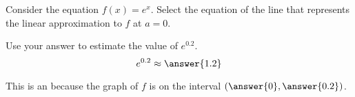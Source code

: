 \documentclass{ximera}
\author{Nela Lakos \and Kyle Parsons}
\begin{document}
\begin{exercise}

Consider the equation $f(x) = e^x$.  Select the equation of the line that represents the linear approximation to $f$ at $a=0$.
\begin{multipleChoice}
\end{multipleChoice}

Use your answer to estimate the value of $e^{0.2}$.
\[ e^{0.2} \approx \answer{1.2} \]

This is an
because the graph of $f$ is 
on the interval $\left( \answer{0}, \answer{0.2} \right)$.


\end{exercise}
\end{document}

